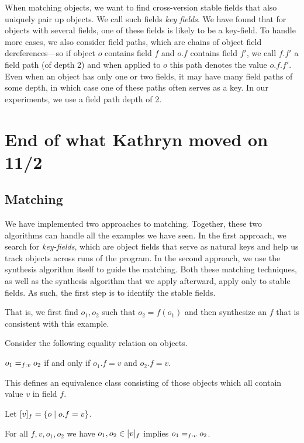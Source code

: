 When matching objects, we want to find cross-version stable fields
that also uniquely pair up objects.  We call such fields \emph{key
  fields}.  We have found that for objects with several fields, one of
these fields is likely to be a key-field.  To handle more cases, we
also consider field paths, which are chains of object field
dereferences---so if object $o$ contains field $f$ and $o.f$ contains
field $f'$, we call $f.f'$ a field path (of depth 2) and when applied
to $o$ this path denotes the value $o.f.f'$.  Even when an object has
only one or two fields, it may have many field paths of some depth, in
which case one of these paths often serves as a key.  In our
experiments, we use a field path depth of 2.



\section{End of what Kathryn moved on 11/2}

\subsection{Matching}

We have implemented two approaches to matching.  Together, these two
algorithms can handle all the examples we have seen.  In the first
approach, we search for \emph{key-fields}, which are object fields
that serve as natural keys and help us track objects across runs of
the program.  In the second approach, we use the synthesis algorithm
itself to guide the matching.  Both these matching techniques, as well
as the synthesis algorithm that we apply afterward, apply only to
stable fields.  As such, the first step is to identify the stable
fields.




That is, we first find $o_1, o_2$ such that $o_2 = f(o_1)$ and then synthesize an $f$ that is consistent with this example.

Consider the following equality relation on objects.
\begin{defn}
$o_1 \eqfv{f}{v} o_2$ if and only if $o_1.f = v$ and $o_2.f = v$.
\end{defn}

This defines an equivalence class consisting of those objects which
all contain value $v$ in field $f$.
\begin{defn}
Let $\eqfvclass{f}{v} = \{o \mid o.f = v\}$.
\end{defn}
For all $f, v, o_1, o_2$ we have $o_1, o_2 \in \eqfvclass{f}{v}$ implies $o_1 \eqfv{f}{v} o_2$.


